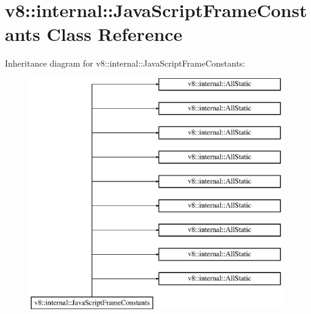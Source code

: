 \hypertarget{classv8_1_1internal_1_1_java_script_frame_constants}{}\section{v8\+:\+:internal\+:\+:Java\+Script\+Frame\+Constants Class Reference}
\label{classv8_1_1internal_1_1_java_script_frame_constants}
Inheritance diagram for v8\+:\+:internal\+:\+:Java\+Script\+Frame\+Constants\+:\begin{figure}[H]
\begin{center}
\leavevmode
\includegraphics[height=10.000000cm]{classv8_1_1internal_1_1_java_script_frame_constants}
\end{center}
\end{figure}
